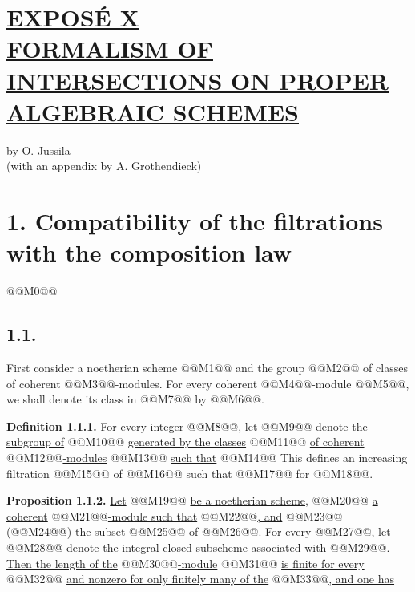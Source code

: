 
\section*{\underline{EXPOSÉ X}\\[3pt] \underline{\underline{FORMALISM OF INTERSECTIONS ON PROPER ALGEBRAIC SCHEMES}}}
\begin{center}
\underline{by O. Jussila}\\
(with an appendix by A. Grothendieck)
\end{center}

\section*{1. Compatibility of the filtrations with the composition law}
@@M0@@

\subsection*{1.1.}
First consider a noetherian scheme @@M1@@ and the group @@M2@@ of classes of coherent @@M3@@-modules. For every coherent @@M4@@-module @@M5@@, we shall denote its class in @@M7@@ by @@M6@@.

\textbf{Definition 1.1.1.} \uline{For every integer} @@M8@@, \uline{let} @@M9@@ \uline{denote the subgroup of} @@M10@@ \uline{generated by the classes} @@M11@@ \uline{of coherent} @@M12@@\uline{-modules} @@M13@@ \uline{such that}
@@M14@@
This defines an increasing filtration @@M15@@ of @@M16@@ such that @@M17@@ for @@M18@@.

\textbf{Proposition 1.1.2.} \uline{Let} @@M19@@ \uline{be a noetherian scheme,} @@M20@@ \uline{a coherent} @@M21@@\uline{-module such that} @@M22@@\uline{, and} @@M23@@ (@@M24@@\uline{) the subset} @@M25@@ \uline{of} @@M26@@\uline{. For every} @@M27@@, \uline{let} @@M28@@ \uline{denote the integral closed subscheme associated with} @@M29@@\uline{. Then the length of the} @@M30@@\uline{-module} @@M31@@ \uline{is finite for every} @@M32@@ \uline{and nonzero for only finitely many of the} @@M33@@\uline{, and one has}

